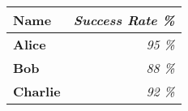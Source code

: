 \begin{tabular}{|>{\bfseries}l|>{\itshape}r<{\%}|}
\hline
Name       & Success Rate \\ \hline
Alice      & 95           \\
Bob        & 88           \\
Charlie    & 92           \\ \hline
\end{tabular}
